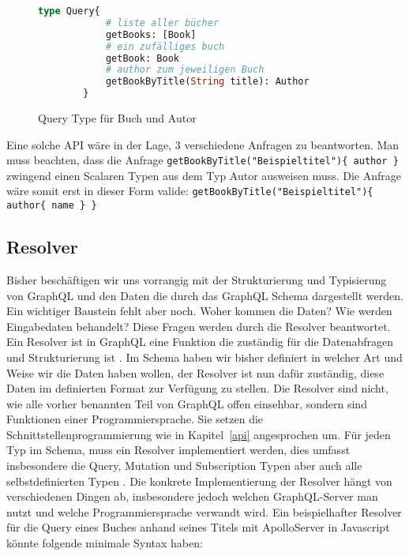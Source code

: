 \begin{figure}[htb]
    \begin{center}
        \begin{lstlisting}[language=GraphQL]
        type Query{
            # liste aller bücher
            getBooks: [Book]
            # ein zufälliges buch
            getBook: Book
            # author zum jeweiligen Buch
            getBookByTitle(String title): Author
        }
        \end{lstlisting}
    \end{center}
    \caption{Query Type für Buch und Autor}
    \label{minimalquerytype}
\end{figure}

Eine solche API wäre in der Lage, 3 verschiedene Anfragen zu beantworten.
Man muss beachten, dass die Anfrage \verb+getBookByTitle("Beispieltitel"){ author }+ zwingend einen Scalaren Typen aus dem Typ Autor ausweisen muss.
Die Anfrage wäre somit erst in dieser Form valide: \verb+getBookByTitle("Beispieltitel"){ author{ name } }+

\subsection{Resolver}
\label{resolver}

Bisher beschäftigen wir uns vorrangig mit der Strukturierung und Typisierung von GraphQL und den Daten die durch
das GraphQL Schema dargestellt werden.
Ein wichtiger Baustein fehlt aber noch.
Woher kommen die Daten?
Wie werden Eingabedaten behandelt?
Diese Fragen werden durch die Resolver beantwortet.
Ein Resolver ist in GraphQL eine Funktion die zuständig für die Datenabfragen und Strukturierung ist \cite[vgl.]{apolloqgl}.
Im Schema haben wir bisher definiert in welcher Art und Weise wir die Daten haben wollen, der Resolver ist nun dafür zuständig,
diese Daten im definierten Format zur Verfügung zu stellen.
Die Resolver sind nicht, wie alle vorher benannten Teil von GraphQL offen einsehbar, sondern sind Funktionen einer Programmiersprache.
Sie setzen die Schnittstellenprogrammierung wie in Kapitel~\ref{api} angesprochen um.
Für jeden Typ im Schema, muss ein Resolver implementiert werden, dies umfasst insbesondere die Query, Mutation und Subscription Typen aber auch
alle selbstdefinierten Typen \cite[vgl.]{apolloqgl}.
Die konkrete Implementierung der Resolver hängt von verschiedenen Dingen ab, insbesondere jedoch welchen GraphQL-Server man nutzt und welche Programmiersprache verwandt wird.
Ein beispielhafter Resolver für die Query eines Buches anhand seines Titels mit ApolloServer in Javascript könnte folgende minimale Syntax haben:

